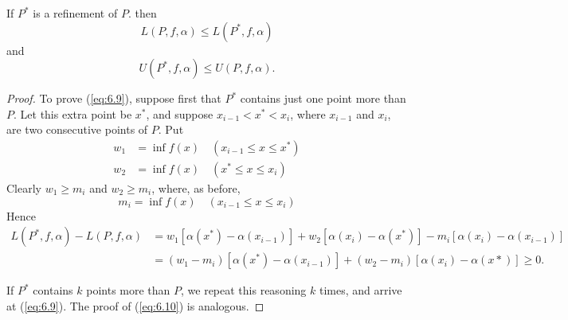 \begin{thm}
    \label{thm:6.4}
    If $P^*$ is a refinement of $P$. then
    \begin{equation}
        \label{eq:6.9}
        L(P,   f, \alpha) \leq 
        L(P^*, f, \alpha) 
    \end{equation}
    and 
    \begin{equation}
        \label{eq:6.10}
        U(P^*, f, \alpha) \leq 
        U(P,   f, \alpha) .
    \end{equation}
\end{thm}
\begin{proof}
    To prove (\ref{eq:6.9}), 
    suppose first that $P^*$ contains just one point more than $P$. 
    Let this extra point be $x^*$, 
    and suppose $x_{i-1} < x^{*} < x_{i}$, 
    where $x_{i-1}$ and $x_{i}$, are two consecutive points of $P$. 
    Put
    \begin{align*}
        w_1 &= \inf f(x) \quad (x_{i-1} \leq x \leq x^{*}) \\
        w_2 &= \inf f(x) \quad (x^{*} \leq x \leq x_{i})        
    \end{align*} 
    Clearly $w_1 \geq m_i$ and $w_2 \geq m_i$, 
    where, as before,
    \begin{equation*}
        m_i = \inf f(x) \quad (x_{i-1} \leq x \leq x_{i})
    \end{equation*}
    Hence
    \begin{align*}
        L(P^*,f, \alpha ) - L(P,f, \alpha )
        &= w_1[\alpha (x^*) - \alpha (x_{i-1})] 
         + w_2[\alpha (x_i) - \alpha (x^*)] 
         - m_i[\alpha (x_i) - \alpha (x_{i-1})] \\
        &= (w_1 - m_i)[\alpha (x^*) - \alpha (x_{i-1})] 
         + (w_2 - m_i)[\alpha (x_i) - \alpha (x*)] \geq 0.
    \end{align*}
    
    If $P^*$ contains $k$ points more than $P$, 
    we repeat this reasoning $k$ times, 
    and arrive at (\ref{eq:6.9}). 
    The proof of (\ref{eq:6.10}) is analogous.
\end{proof}


